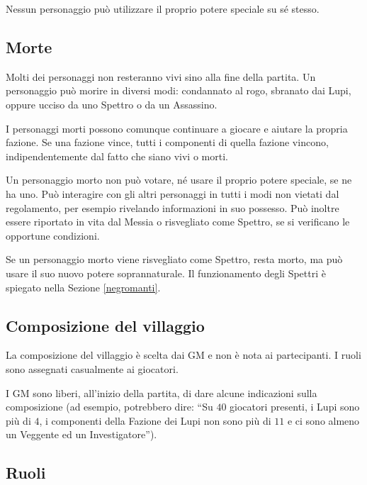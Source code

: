 \documentclass[a4paper,10pt]{article}
\begin{document}
Nessun personaggio può utilizzare il proprio potere speciale su sé stesso.

\subsection{Morte}

Molti dei personaggi non resteranno vivi sino alla fine della partita. Un personaggio può morire in diversi modi: condannato al rogo, sbranato dai Lupi, oppure ucciso da uno Spettro o da un Assassino.

I personaggi morti possono comunque continuare a giocare e aiutare la propria fazione. Se una fazione vince, tutti i componenti di quella fazione vincono, indipendentemente dal fatto che siano vivi o morti.

Un personaggio morto non può votare, né usare il proprio potere speciale, se ne ha uno. Può interagire con gli altri personaggi in tutti i modi non vietati dal regolamento, per esempio rivelando informazioni in suo possesso. Può inoltre essere riportato in vita dal Messia o risvegliato come Spettro, se si verificano le opportune condizioni.

Se un personaggio morto viene risvegliato come Spettro, resta morto, ma può usare il suo nuovo potere soprannaturale. Il funzionamento degli Spettri è spiegato nella Sezione \ref{negromanti}.

\subsection{Composizione del villaggio}
 
La composizione del villaggio è scelta dai GM e non è nota ai partecipanti. I ruoli sono assegnati casualmente ai giocatori.

I GM sono liberi, all'inizio della partita, di dare alcune indicazioni sulla composizione (ad esempio, potrebbero dire: ``Su $40$ giocatori presenti, i Lupi sono più di $4$, i componenti della Fazione dei Lupi non sono più di $11$ e ci sono almeno un Veggente ed un Investigatore'').

\subsection{Ruoli}
\label{ruoli}

\end{document}
